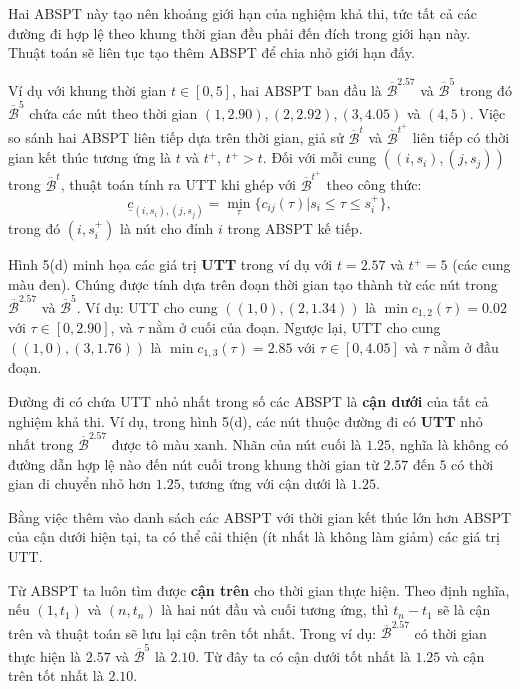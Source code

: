 \documentclass[../main.tex]{subfiles}
\begin{document}
Hai ABSPT này tạo nên khoảng giới hạn của nghiệm khả thi, tức tất cả các đường đi
hợp lệ theo khung thời gian đều phải đến đích trong giới hạn này. Thuật
toán sẽ liên tục tạo thêm ABSPT để chia nhỏ giới hạn đấy. 

Ví dụ với
khung thời gian \(t\in [0,5]\), hai ABSPT ban đầu là
\(\overline{\mathcal B}^{2.57}\) và \(\overline{\mathcal B}^{5}\) trong đó
\(\overline{\mathcal B}^{5}\) chứa các nút theo thời gian
\((1, 2.90), (2, 2.92), (3, 4.05)\) và \((4, 5)\). Việc so sánh hai ABSPT liên tiếp dựa trên thời gian,
giả sử \(\overline{\mathcal B}^t\) và
\(\overline{\mathcal B}^{t^+}\) liên tiếp có thời gian kết thúc tương ứng là
\(t\) và \(t^+\), \(t^+>t\). Đối với mỗi cung \(((i, s_i), (j, s_j))\)
trong \(\overline{\mathcal B}^t\), thuật toán tính ra UTT khi ghép với
\(\overline{\mathcal B}^{t^+}\) theo công thức:
\[    \underline c_{(i, s_i),(j, s_j)}=\min_\tau\{c_{ij}(\tau)|s_i\le\tau\le s_i^+\},\]
trong đó \((i, s_i^+)\) là nút cho đỉnh \(i\) trong ABSPT kế tiếp. 

Hình 5(d)
minh họa các giá trị \textbf{UTT} trong ví dụ với \(t = 2.57\) và
\(t^+  = 5\) (các cung màu đen). Chúng được tính dựa trên đoạn thời gian
tạo thành từ các nút trong \(\overline{\mathcal B}^{2.57}\) và
\(\overline{\mathcal B}^{5}\). Ví dụ: UTT cho cung \(((1, 0),(2, 1.34))\) là
\(\min c_{1, 2}(\tau) = 0.02\) với \(\tau \in [0, 2.90]\), và \(\tau\)
nằm ở cuối của đoạn. Ngược lại, UTT cho cung \(((1, 0),(3, 1.76))\) là
\(\min c_{1,3}(\tau) = 2.85\) với \(\tau \in [0, 4.05]\) và \(\tau\)
nằm ở đầu đoạn.

Đường đi có chứa UTT nhỏ nhất trong số các ABSPT là \textbf{cận dưới}
của tất cả nghiệm khả thi. Ví dụ, trong hình 5(d), các nút thuộc
đường đi có \textbf{UTT} nhỏ nhất trong \(\overline{\mathcal B}^{2.57}\)
được tô màu xanh. Nhãn của nút cuối là \(1.25\), nghĩa là không có đường
dẫn hợp lệ nào đến nút cuối trong khung thời gian từ \(2.57\) đến \(5\)
có thời gian di chuyển nhỏ hơn \(1.25\), tương ứng với cận dưới là
\(1.25\).

Bằng việc thêm vào danh sách các ABSPT với thời gian kết thúc lớn hơn
ABSPT của cận dưới hiện tại, ta có thể cải thiện (ít nhất là không làm
giảm) các giá trị UTT.

Từ ABSPT ta luôn tìm được \textbf{cận trên} cho thời gian thực hiện.
Theo định nghĩa, nếu \((1, t_1)\) và \((n, t_n)\) là hai nút đầu và cuối
tương ứng, thì \(t_n - t_1\) sẽ là cận trên và thuật toán sẽ lưu lại cận
trên tốt nhất. Trong ví dụ: \(\overline{\mathcal B}^{2.57}\) có thời gian
thực hiện là \(2.57\) và \(\overline{\mathcal B}^{5}\) là \(2.10\). Từ đây
ta có cận dưới tốt nhất là \(1.25\) và cận trên tốt nhất là \(2.10\).
\end{document}

